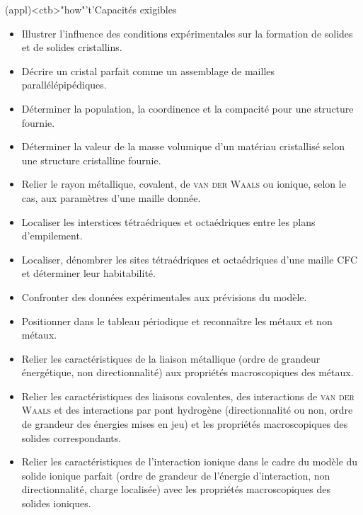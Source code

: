 \documentclass[../../main/main.tex]{subfiles}
\begin{document}
\begin{tcn}[fontupper=\footnotesize, fontlower=\footnotesize, sidebyside](appl)<ctb>"how"'t'{Capacités exigibles}
	\begin{itemize}[label=\rcheck]
		\item Illustrer l'influence des conditions expérimentales sur la formation
		      de solides et de solides cristallins.

		\item Décrire un cristal parfait comme un assemblage de mailles
		      parallélépipédiques.

		\item Déterminer la population, la coordinence et la compacité pour une
		      structure fournie.

		\item Déterminer la valeur de la masse volumique d'un matériau cristallisé
		      selon une structure cristalline fournie.

		\item Relier le rayon métallique, covalent, de \textsc{van der Waals} ou
		      ionique, selon le cas, aux paramètres d'une maille donnée.

		\item Localiser les interstices tétraédriques et octaédriques entre les
		      plans d'empilement.

		\item Localiser, dénombrer les sites tétraédriques et octaédriques d'une
		      maille CFC et déterminer leur habitabilité.
	\end{itemize}
	\tcblower
	\begin{itemize}[label=\rcheck]
		\item Confronter des données expérimentales aux prévisions du modèle.

		\item Positionner dans le tableau périodique et reconnaître les métaux et
		      non métaux.

		\item Relier les caractéristiques de la liaison métallique (ordre de
		      grandeur énergétique, non directionnalité) aux propriétés
		      macroscopiques des métaux.

		\item Relier les caractéristiques des liaisons covalentes, des interactions
		      de \textsc{van der Waals} et des interactions par pont hydrogène
		      (directionnalité ou non, ordre de grandeur des énergies mises en jeu)
		      et les propriétés macroscopiques des solides correspondants.

		\item Relier les caractéristiques de l'interaction ionique dans le cadre du
		      modèle du solide ionique parfait (ordre de grandeur de l'énergie
		      d'interaction, non directionnalité, charge localisée) avec les
		      propriétés macroscopiques des solides ioniques.
	\end{itemize}
\end{tcn}
\end{document}
